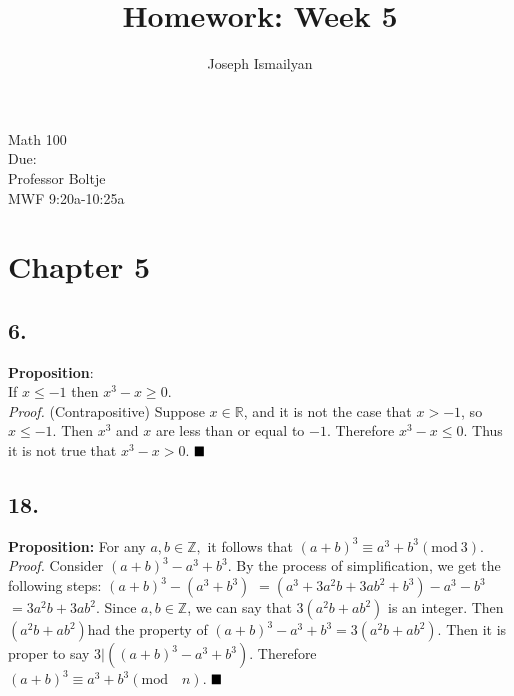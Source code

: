 \documentclass[12pt]{article}
\newcommand{\dueDate}{\formatdate{3}{11}{2017}} %
\newcommand{\hwNum}{5}
\begin{document}
	
\title{Homework: Week \hwNum}
\author{Joseph Ismailyan}
\date{}
\maketitle
\begin{flushleft}
Math 100 \\
Due: \dueDate \\ 
Professor Boltje \\
MWF 9:20a-10:25a
\end{flushleft}


\begin{minipage}[t]{0.40\textwidth}



\section*{Chapter 5}
\subsection*{6.}
 
\textbf{Proposition}:  \\If $ x\leq -1 $ then $ x^3-x\geq 0 $.
\\\textit{Proof.} (Contrapositive) Suppose $ x \in \mathbb{R} $, and it is not the case that $ x>-1 $, so $ x\leq -1 $. Then $ x^3 $ and $ x $ are less than or equal to $ -1 $. Therefore $ x^3-x\leq0 $. Thus it is not true that $ x^3-x>0 $.
$ \hfill\blacksquare $ 

\subsection*{18.}
\textbf{Proposition:} For any $ a,b\in \mathbb{Z}, $ it follows that $ (a+b)^3 \equiv a^3+b^3 (\mathrm{mod}\ 3)$.
\\\textit{Proof.} Consider $ (a+b)^3 -  a^3+b^3 $. By the process of simplification, we get the following steps: $ (a+b)^3 - (a^3+b^3) $ 
 $= (a^3+3a^2b+3ab^2+b^3) -a^3-b^3 $ 
 $= 3a^2b+3ab^2 $. Since  $ a,b\in \mathbb{Z} $, we can say that $ 3(a^2b+ab^2) $ is an integer. Then $ (a^2b+ab^2) $had the property of $ (a+b)^3 -  a^3+b^3 = 3(a^2b+ab^2) $. Then it is proper to say $ 3|((a+b)^3 -  a^3+b^3) $. Therefore $ (a+b)^3 \equiv a^3+b^3 (\mathrm{mod}\quad n)$.
$ \hfill\blacksquare $ 
\end{minipage}
\end{document}
